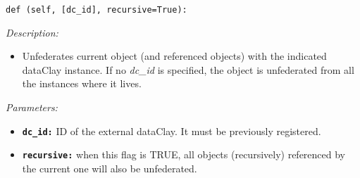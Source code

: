 \begin{dBox}

\texttt{def (self, [dc\_id], recursive=True):}
\LINE

{\it Description:}

\begin{itemize}
  \item Unfederates current object (and referenced objects) with the indicated dataClay instance. If no \textit{dc\_id} is specified, the object is unfederated from all the instances where it lives.
\end{itemize}

{\it Parameters:}

\begin{itemize}
  \item \texttt{\bfseries dc\_id:} ID of the external dataClay. It must be previously registered.
  \item \texttt{\bfseries recursive:} when this flag is TRUE, all objects (recursively) referenced by the current one will also be unfederated.
\end{itemize}

\end{dBox}






